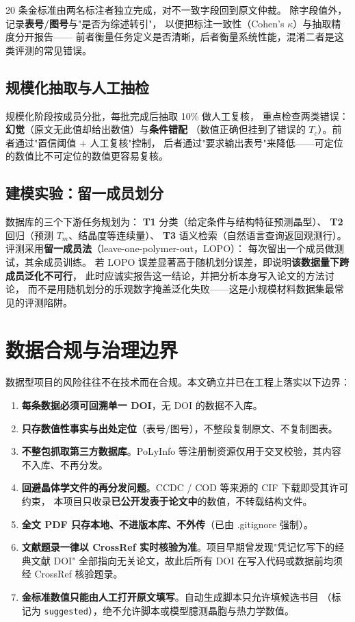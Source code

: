 \documentclass[11pt,a4paper]{ctexart}
\begin{document}
20 条金标准由两名标注者独立完成，对不一致字段回到原文仲裁。
除字段值外，记录\textbf{表号/图号}与"是否为综述转引"，
以便把标注一致性（Cohen's $\kappa$）与抽取精度分开报告——
前者衡量任务定义是否清晰，后者衡量系统性能，混淆二者是这类评测的常见错误。

\subsection{规模化抽取与人工抽检}

规模化阶段按成员分批，每批完成后抽取 10\% 做人工复核，
重点检查两类错误：\textbf{幻觉}（原文无此值却给出数值）与\textbf{条件错配}
（数值正确但挂到了错误的 $T_c$）。前者通过"置信阈值 + 人工复核"控制，
后者通过"要求输出表号"来降低——可定位的数值比不可定位的数值更容易复核。

\subsection{建模实验：留一成员划分}

数据库的三个下游任务规划为：
\textbf{T1} 分类（给定条件与结构特征预测晶型）、
\textbf{T2} 回归（预测 $T_m$、结晶度等连续量）、
\textbf{T3} 语义检索（自然语言查询返回观测行）。
评测采用\textbf{留一成员法}（leave-one-polymer-out，LOPO）：
每次留出一个成员做测试，其余成员训练。
若 LOPO 误差显著高于随机划分误差，即说明\textbf{该数据量下跨成员泛化不可行}，
此时应诚实报告这一结论，并把分析本身写入论文的方法讨论，
而不是用随机划分的乐观数字掩盖泛化失败——这是小规模材料数据集最常见的评测陷阱。

\section{数据合规与治理边界}\label{sec:compliance}

数据型项目的风险往往不在技术而在合规。本文确立并已在工程上落实以下边界：

\begin{enumerate}[label=(\arabic*), leftmargin=2.2em]
  \item \textbf{每条数据必须可回溯单一 DOI}，无 DOI 的数据不入库。
  \item \textbf{只存数值性事实与出处定位}（表号/图号），不整段复制原文、不复制图表。
  \item \textbf{不整包抓取第三方数据库}。PoLyInfo 等注册制资源仅用于交叉校验，其内容不入库、不再分发。
  \item \textbf{回避晶体学文件的再分发问题}。CCDC / COD 等来源的 CIF 下载即受其许可约束，
        本项目只收录\textbf{已公开发表于论文中}的数值，不转载结构文件。
  \item \textbf{全文 PDF 只存本地、不进版本库、不外传}（已由 .gitignore 强制）。
  \item \textbf{文献题录一律以 CrossRef 实时核验为准}。项目早期曾发现"凭记忆写下的经典文献 DOI"
        全部指向无关论文，故此后所有 DOI 在写入代码或数据前均须经 CrossRef 核验题录。
  \item \textbf{金标准数值只能由人工打开原文填写}。自动生成脚本只允许填候选书目
        （标记为 \texttt{suggested}），绝不允许脚本或模型臆测晶胞与热力学数值。
\end{enumerate}
\end{document}
